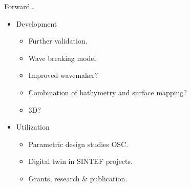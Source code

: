 \documentclass{sintefbeamer}
\renewcommand{\_}[1]{_\mr{#1}}
\begin{document}
\begin{frame}{Forward\ldots}
	\begin{itemize}
		\item Development
		\begin{itemize}
			\item Further validation.
			\item Wave breaking model.
			\item Improved wavemaker? 
			\item Combination of bathymetry and surface mapping?
			\item 3D?
		\end{itemize}
	\item Utilization
		\begin{itemize}
			\item Parametric design studies OSC.
			\item Digital twin in SINTEF projects.
			\item Grants, research \& publication.
		\end{itemize} 
	\end{itemize}

\end{frame}



\backmatter
\end{document}
